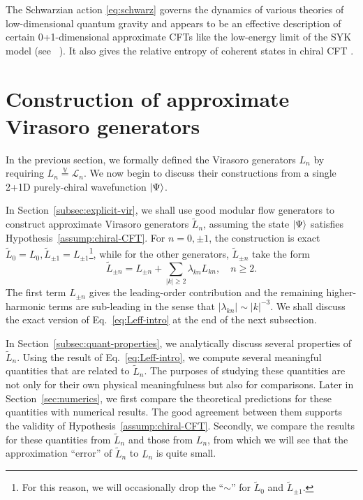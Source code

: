 \documentclass[12pt, nofootinbib]{article}
\theoremstyle{plain}
\theoremstyle{assumption}
\theoremstyle{definition}
\theoremstyle{plain}
\theoremstyle{plain}
\theoremstyle{plain}
\theoremstyle{plain}
\theoremstyle{plain}
\def\veq{\stackrel{\mathbb{V}}{=}}
\def\Leff{\widetilde{L}}
\def\Lcft{\mathscr{L}}
\begin{document}
The Schwarzian action \eqref{eq:schwarz} governs the dynamics of various theories of low-dimensional quantum gravity and appears to be an effective description of certain 0+1-dimensional approximate CFTs like the low-energy limit of the SYK model (see \eg~\cite{Stanford:2017thb}).  
It also gives the relative entropy of coherent states in chiral CFT \cite{Hollands2019}. 


\section{Construction of approximate Virasoro generators}
\label{sec:virasoro-construction}
In the previous section, we formally defined the Virasoro generators $L_n$ by requiring $L_n \veq \Lcft_n$. We now begin to discuss their constructions from a single 2+1D purely-chiral wavefunction $\left|\Psi\right\rangle$. 

In Section~\ref{subsec:explicit-vir}, we shall use good modular flow generators to construct approximate Virasoro generators $\Leff_n$, assuming the state $\left|\Psi\right\rangle$ satisfies Hypothesis~\ref{assump:chiral-CFT}. For $n=0,\pm 1$, the construction is exact $\Leff_0 = L_0,\Leff_{\pm 1} = L_{\pm 1}$\footnote{For this reason, we will occasionally drop the ``$\sim$'' for $\Leff_0$ and $\Leff_{\pm 1}$.}, while for the other generators, $\Leff_{\pm n}$ take the form 
\begin{equation}\label{eq:Leff-intro}
    \Leff_{\pm n} = L_{\pm n} + \sum_{|k|\geq 2} \lambda_{k n} L_{k n},\quad n\geq 2.
\end{equation}
The first term $L_{\pm n}$ gives the leading-order contribution and the remaining higher-harmonic terms are sub-leading in the sense that $|\lambda_{kn}| \sim |k|^{-3}$. We shall discuss the exact version of Eq.~\eqref{eq:Leff-intro} at the end of the next subsection. 

In Section~\ref{subsec:quant-properties}, we analytically discuss several properties of $\Leff_n$. Using the result of Eq.~\eqref{eq:Leff-intro}, we compute several meaningful quantities that are related to $\Leff_n$. The purposes of studying these quantities are not only for their own physical meaningfulness but also for comparisons. Later in Section~\ref{sec:numerics}, we first compare the theoretical predictions for these quantities with numerical results. The good agreement between them supports the validity of Hypothesis~\ref{assump:chiral-CFT}. Secondly, we compare the results for these quantities from $\Leff_n$ and those from $L_n$, from which we will see that the approximation ``error'' of $\Leff_{n}$ to $L_{n}$ is quite small. 
\end{document}
